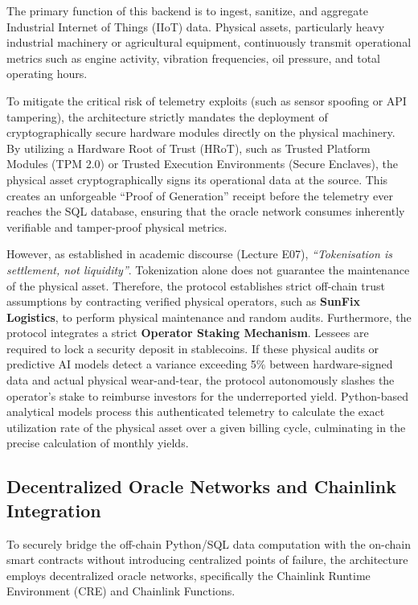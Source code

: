 \documentclass{Resources/bdlt-project}
\begin{document}
The primary function of this backend is to ingest, sanitize, and aggregate Industrial Internet of Things (IIoT) data. Physical assets, particularly heavy industrial machinery or agricultural equipment, continuously transmit operational metrics such as engine activity, vibration frequencies, oil pressure, and total operating hours.

To mitigate the critical risk of telemetry exploits (such as sensor spoofing or API tampering), the architecture strictly mandates the deployment of cryptographically secure hardware modules directly on the physical machinery. By utilizing a Hardware Root of Trust (HRoT), such as Trusted Platform Modules (TPM 2.0) or Trusted Execution Environments (Secure Enclaves), the physical asset cryptographically signs its operational data at the source. This creates an unforgeable ``Proof of Generation'' receipt before the telemetry ever reaches the SQL database, ensuring that the oracle network consumes inherently verifiable and tamper-proof physical metrics. 

However, as established in academic discourse (Lecture E07), \textit{``Tokenisation is settlement, not liquidity''}. Tokenization alone does not guarantee the maintenance of the physical asset. Therefore, the protocol establishes strict off-chain trust assumptions by contracting verified physical operators, such as \textbf{SunFix Logistics}, to perform physical maintenance and random audits. Furthermore, the protocol integrates a strict \textbf{Operator Staking Mechanism}. Lessees are required to lock a security deposit in stablecoins. If these physical audits or predictive AI models detect a variance exceeding 5\% between hardware-signed data and actual physical wear-and-tear, the protocol autonomously slashes the operator's stake to reimburse investors for the underreported yield. Python-based analytical models process this authenticated telemetry to calculate the exact utilization rate of the physical asset over a given billing cycle, culminating in the precise calculation of monthly yields.

\subsection{Decentralized Oracle Networks and Chainlink Integration}
To securely bridge the off-chain Python/SQL data computation with the on-chain smart contracts without introducing centralized points of failure, the architecture employs decentralized oracle networks, specifically the Chainlink Runtime Environment (CRE) and Chainlink Functions.
\end{document}
